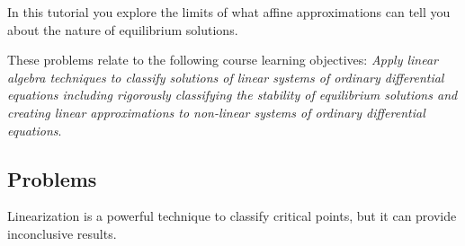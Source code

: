 \begin{objectives}
	In this tutorial you explore the limits of what affine approximations can
	tell you about the nature of equilibrium solutions.

	These problems relate to the following course learning objectives:
	\textit{Apply linear algebra techniques to classify solutions of linear systems of ordinary differential
	equations including rigorously classifying the stability of equilibrium solutions and creating
	linear approximations to non-linear systems of ordinary differential equations}.
\end{objectives}

\subsection*{Problems}

Linearization is a powerful technique to classify critical points, but it can provide inconclusive results.

